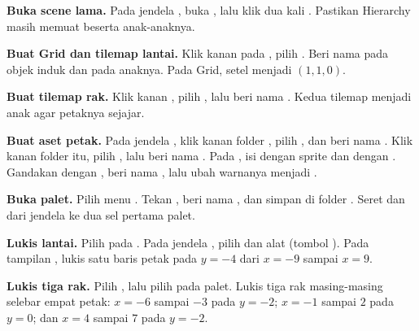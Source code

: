 \begin{langkah}
  \item \textbf{Buka scene lama.} Pada jendela , buka
        , lalu klik dua kali . Pastikan
        Hierarchy masih memuat  beserta anak-anaknya.

  \item \textbf{Buat Grid dan tilemap lantai.} Klik kanan pada
        , pilih . Beri
        nama  pada objek induk dan  pada
        anaknya. Pada  Grid, setel  menjadi
        $(1,1,0)$.

  \item \textbf{Buat tilemap rak.} Klik kanan , pilih
        , lalu beri nama
        . Kedua tilemap menjadi anak  agar
        petaknya sejajar.

  \item \textbf{Buat aset petak.} Pada jendela , klik kanan
        folder , pilih , dan beri nama
        . Klik kanan folder itu, pilih
        , lalu beri nama .
        Pada , isi  dengan sprite 
        dan  dengan . Gandakan dengan
        , beri nama , lalu ubah warnanya menjadi
        .

  \item \textbf{Buka palet.} Pilih menu .
        Tekan , beri nama , dan
        simpan di folder . Seret  dan
         dari jendela  ke dua sel pertama palet.

  \item \textbf{Lukis lantai.} Pilih  pada
        . Pada jendela , pilih
         dan alat  (tombol ). Pada
        tampilan , lukis satu baris petak pada $y=-4$ dari $x=-9$
        sampai $x=9$.

  \item \textbf{Lukis tiga rak.} Pilih , lalu pilih
         pada palet. Lukis tiga rak masing-masing selebar empat
        petak: $x=-6$ sampai $-3$ pada $y=-2$; $x=-1$ sampai $2$ pada $y=0$;
        dan $x=4$ sampai $7$ pada $y=-2$.


\end{langkah}
